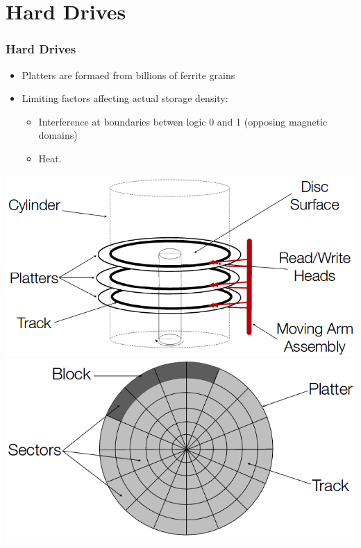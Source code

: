\documentclass{beamer}
\begin{document}
\section{Hard Drives}
\begin{frame}
\frametitle{Hard Drives}
\begin{itemize}
\item Platters are formaed from billions of ferrite grains
\item Limiting factors affecting actual storage density:
\begin{itemize}
\item Interference at boundaries betwen logic 0 and 1 (opposing magnetic domains)
\item Heat.
\end{itemize}
\end{itemize}
\includegraphics[scale=0.2]{hdd.png}
\includegraphics[scale=0.2]{disk.png}
\end{frame}
\end{document}
